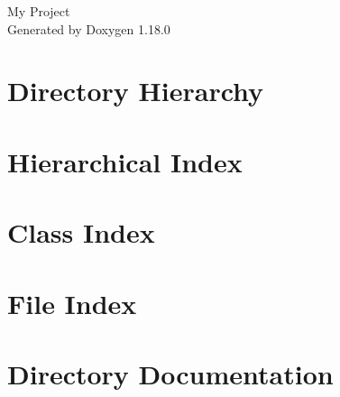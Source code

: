 \documentclass[twoside]{book}
\newcommand{\+}{\discretionary{\mbox{\scriptsize$\hookleftarrow$}}{}{}}
\newcommand{\clearemptydoublepage}{%
    \newpage{\pagestyle{empty}\cleardoublepage}%
  }
\begin{document}
  \raggedbottom
    \hypersetup{pageanchor=false,
                bookmarksnumbered=true,
                pdfencoding=unicode
               }
  \begin{titlepage}
  \vspace*{7cm}
  \begin{center}%
  {\Large My Project}\\
  \vspace*{1cm}
  {\large Generated by Doxygen 1.18.0}\\
  \end{center}
  \end{titlepage}
  \clearemptydoublepage
  \tableofcontents
  \clearemptydoublepage
  \hypersetup{pageanchor=true}
\chapter{Directory Hierarchy}

\chapter{Hierarchical Index}

\chapter{Class Index}

\chapter{File Index}

\chapter{Directory Documentation}













\end{document}
